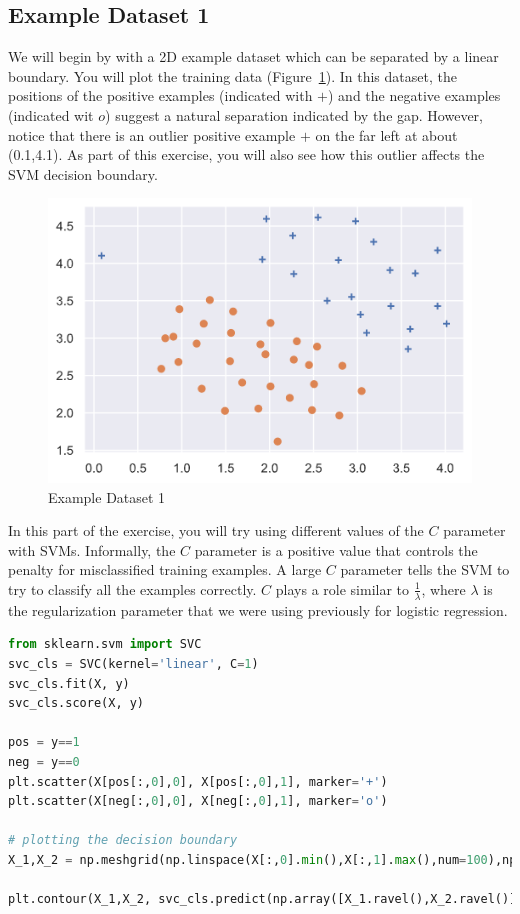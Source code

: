 \documentclass[12pt]{article}
\begin{document}
\subsection{Example Dataset 1}

We will begin by with a 2D example dataset which can be separated by a linear boundary.  You will plot the training data (Figure~\ref{fig:scatter}).  In this dataset, the positions of the positive examples (indicated with $+$) and the negative examples (indicated wit $o$) suggest a natural separation indicated by the gap.  However, notice that there is an outlier positive example $+$ on the far left at about (0.1,4.1).  As part of this exercise, you will also see how this outlier affects the SVM decision boundary.

\begin{figure}[h!]
  \centering
  \includegraphics[scale=0.6]{scatter.png}
  \caption{Example Dataset 1}
  \label{fig:scatter}
\end{figure}

In this part of the exercise, you will try using different values of the $C$ parameter with SVMs.  Informally, the $C$ parameter is a positive value that controls the penalty for misclassified training examples.  A large $C$ parameter tells the SVM to try to classify all the examples correctly. $C$ plays a role similar to $\frac{1}{\lambda}$, where $\lambda$ is the regularization  parameter that we were using previously for logistic regression.

\begin{lstlisting}[language=Python]
from sklearn.svm import SVC
svc_cls = SVC(kernel='linear', C=1)
svc_cls.fit(X, y)
svc_cls.score(X, y)

pos = y==1
neg = y==0
plt.scatter(X[pos[:,0],0], X[pos[:,0],1], marker='+')
plt.scatter(X[neg[:,0],0], X[neg[:,0],1], marker='o')

# plotting the decision boundary
X_1,X_2 = np.meshgrid(np.linspace(X[:,0].min(),X[:,1].max(),num=100),np.linspace(X[:,1].min(),X[:,1].max(),num=100))

plt.contour(X_1,X_2, svc_cls.predict(np.array([X_1.ravel(),X_2.ravel()]).T).reshape(X_1.shape),1,colors='b')
\end{lstlisting}
\end{document}
